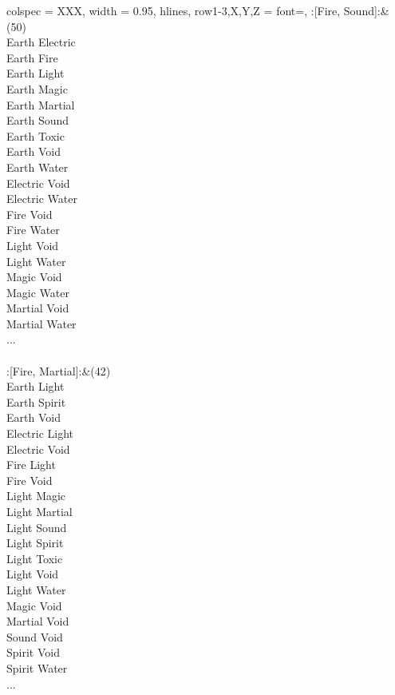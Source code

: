 \twocolumn
\begin{longtblr}[
	caption = {2v2 Attacking Ineffective},
	label = {2v2-Attacking-Ineffective},
]{
	colspec = {XXX}, width = 0.95\linewidth,
	hlines,
	row{1-3,X,Y,Z} = {font=\bfseries},
}
	:[Fire, Sound]:&{(50)\\
	Earth Electric \\
	Earth Fire \\
	Earth Light \\
	Earth Magic \\
	Earth Martial \\
	Earth Sound \\
	Earth Toxic \\
	Earth Void \\
	Earth Water \\
	Electric Void \\
	Electric Water \\
	Fire Void \\
	Fire Water \\
	Light Void \\
	Light Water \\
	Magic Void \\
	Magic Water \\
	Martial Void \\
	Martial Water \\
	...\\
	}\\

	:[Fire, Martial]:&{(42)\\
	Earth Light \\
	Earth Spirit \\
	Earth Void \\
	Electric Light \\
	Electric Void \\
	Fire Light \\
	Fire Void \\
	Light Magic \\
	Light Martial \\
	Light Sound \\
	Light Spirit \\
	Light Toxic \\
	Light Void \\
	Light Water \\
	Magic Void \\
	Martial Void \\
	Sound Void \\
	Spirit Void \\
	Spirit Water \\
	...\\
	}\\


\end{longtblr}
